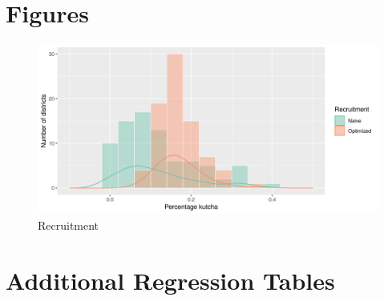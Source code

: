 \documentclass[a4paper,12pt]{article}
\theoremstyle{proposition}
\begin{document}
\clearpage
\appendix

\section{Figures}

\begin{figure}[h]
	\centering
	\includegraphics[width=\linewidth]{figures/recruitment}
	\caption{Recruitment}
    \label{fig:recruitment}
\end{figure}

\clearpage
\section{Additional Regression Tables}








\end{document}
